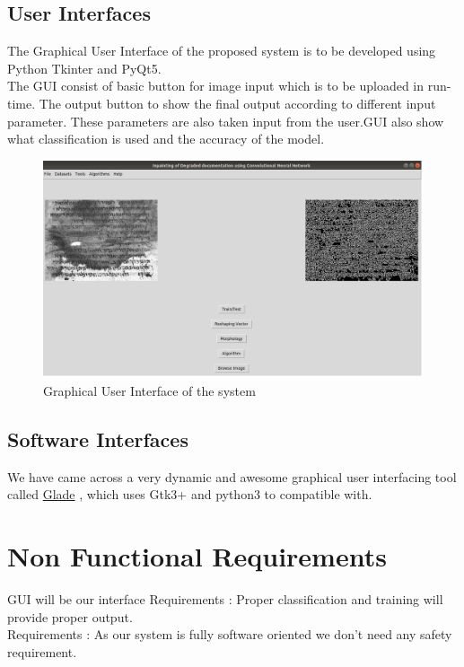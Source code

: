 \documentclass[oneside,a4paper,12pt]{report}
\begin{document}
\subsection{User Interfaces}
The Graphical User Interface of the proposed system is to be developed using Python Tkinter and PyQt5. \\
The GUI consist of basic button for image input which is to be uploaded in run-time. The output button to show the final output according to different input parameter. These parameters are also taken input from the user.GUI also show what classification is used and the accuracy of the model.
\begin{figure}[!htbp]
    \includegraphics[width=\textwidth]{GUI.png}
	\caption{Graphical User Interface of the system}
\end{figure}
\subsection{Software Interfaces}
We have came across a very dynamic and awesome graphical user interfacing tool called \hyperlink{http://www.gnipsel.com/glade/}{Glade} , which uses Gtk3+ and python3 to compatible with.


\section{Non Functional Requirements}
GUI will be our interface Requirements : Proper classification and training will provide proper output. \\
Requirements : As our system is fully software oriented we don’t need any safety requirement.
\end{document}
